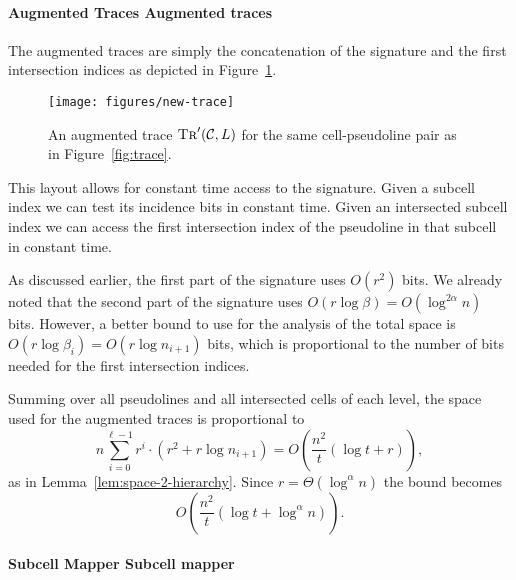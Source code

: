 \paragraph*{\iftitlecase%
Augmented Traces\else%
Augmented traces\fi}

The augmented traces are simply the concatenation of the signature and the
first intersection indices as depicted in Figure~\ref{fig:new-trace}.
%
\begin{figure}
  \centering{}
  \texttt{[image: figures/new-trace]}
  \caption{%
	  An augmented trace \(\textsc{Tr}'(\mathcal{C}, L)\)
      for the same cell-pseudoline pair as in Figure~\ref{fig:trace}.
  }\label{fig:new-trace}
\end{figure}
%
This layout allows for constant time access to the signature.
Given a subcell index we can test its incidence bits in constant time.
Given an intersected subcell index we can access the first intersection index
of the pseudoline in that subcell in constant time.

As discussed earlier, the first part of the signature uses \(O(r^2)\) bits.
We already noted that the second part of the signature
uses \(O(r \log \beta) = O(\log^{2 \alpha} n)\) bits. However, a better bound
to use for the analysis of the total space is
\(O(r \log \beta_i) = O(r \log n_{i+1})\) bits, which is proportional to the
number of bits needed for the first intersection indices.

Summing over all pseudolines and all intersected cells of each level,
the space used for the augmented traces is proportional to
\begin{displaymath}
n \sum_{i=0}^{\ell-1} r^i \cdot \left( r^2 + r \log n_{i+1} \right)
=
O\left(\frac{n^2}{t} (\log t + r)\right),
\end{displaymath}
%
as in Lemma~\ref{lem:space-2-hierarchy}.
Since \(r = \Theta(\log^{\alpha} n)\) the bound becomes
\begin{displaymath}
  O\left(\frac{n^2}{t} (\log t + \log^{\alpha} n)\right).
\end{displaymath}


\paragraph*{\iftitlecase%
Subcell Mapper\else%
Subcell mapper\fi}


